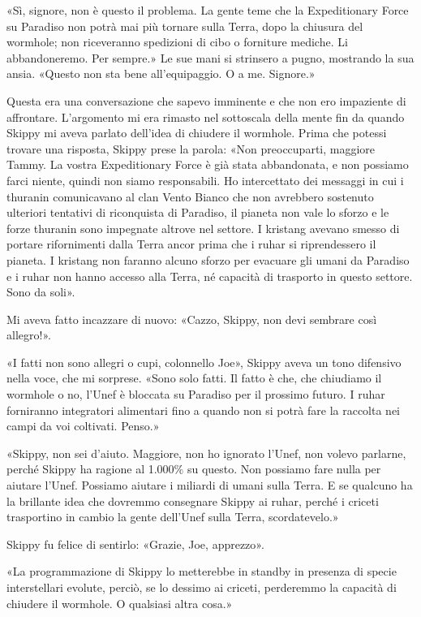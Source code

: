 «Sì, signore, non è questo il problema. La gente teme che la
Expeditionary Force su Paradiso non potrà mai più tornare sulla Terra,
dopo la chiusura del wormhole; non riceveranno spedizioni di cibo o
forniture mediche. Li abbandoneremo. Per sempre.» Le sue mani si
strinsero a pugno, mostrando la sua ansia. «Questo non sta bene
all'equipaggio. O a me. Signore.»

Questa era una conversazione che sapevo imminente e che non ero
impaziente di affrontare. L'argomento mi era rimasto nel sottoscala
della mente fin da quando Skippy mi aveva parlato dell'idea di chiudere
il wormhole. Prima che potessi trovare una risposta, Skippy prese la
parola: «Non preoccuparti, maggiore Tammy. La vostra Expeditionary Force
è già stata abbandonata, e non possiamo farci niente, quindi non siamo
responsabili. Ho intercettato dei messaggi in cui i thuranin
comunicavano al clan Vento Bianco che non avrebbero sostenuto ulteriori
tentativi di riconquista di Paradiso, il pianeta non vale lo sforzo e le
forze thuranin sono impegnate altrove nel settore. I kristang avevano
smesso di portare rifornimenti dalla Terra ancor prima che i ruhar si
riprendessero il pianeta. I kristang non faranno alcuno sforzo per
evacuare gli umani da Paradiso e i ruhar non hanno accesso alla Terra,
né capacità di trasporto in questo settore. Sono da soli».

Mi aveva fatto incazzare di nuovo: «Cazzo, Skippy, non devi sembrare
così allegro!».

«I fatti non sono allegri o cupi, colonnello Joe», Skippy aveva un tono
difensivo nella voce, che mi sorprese. «Sono solo fatti. Il fatto è che,
che chiudiamo il wormhole o no, l'Unef è bloccata su Paradiso per il
prossimo futuro. I ruhar forniranno integratori alimentari fino a quando
non si potrà fare la raccolta nei campi da voi coltivati. Penso.»

«Skippy, non sei d'aiuto. Maggiore, non ho ignorato l'Unef, non volevo
parlarne, perché Skippy ha ragione al 1.000\% su questo. Non possiamo
fare nulla per aiutare l'Unef. Possiamo aiutare i miliardi di umani
sulla Terra. E se qualcuno ha la brillante idea che dovremmo consegnare
Skippy ai ruhar, perché i criceti trasportino in cambio la gente
dell'Unef sulla Terra, scordatevelo.»

Skippy fu felice di sentirlo: «Grazie, Joe, apprezzo».

«La programmazione di Skippy lo metterebbe in standby in presenza di
specie interstellari evolute, perciò, se lo dessimo ai criceti,
perderemmo la capacità di chiudere il wormhole. O qualsiasi altra cosa.»

